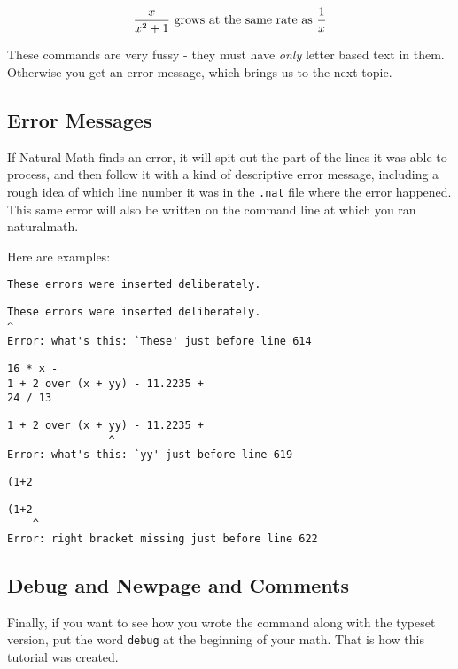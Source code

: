 \documentclass[12pt]{article}
\begin{document}
\[
\frac {x} {{x} ^ {2} + 1} \hbox{ grows at the same rate as } \frac {1} {x}
\]

\noindent These commands are very fussy - they must have {\em only\/} letter based
text in them.  Otherwise you get an error message, which brings us to the
next topic.

\noindent \subsection{Error Messages}

\noindent \indent
If Natural Math finds an error, it will spit out the part of the lines
it was able to process, and then follow it with a kind of descriptive
error message, including a rough idea of which line number it was
in the {\tt .nat} file where the error happened.  This same
error will also be written on the command line at which you ran
naturalmath.

\noindent \indent
Here are examples:

\begin{verbatim}
These errors were inserted deliberately.
\end{verbatim}

\begin{verbatim}
These errors were inserted deliberately.
^
Error: what's this: `These' just before line 614
\end{verbatim}

\begin{verbatim}
16 * x -
1 + 2 over (x + yy) - 11.2235 +
24 / 13
\end{verbatim}

\begin{verbatim}
1 + 2 over (x + yy) - 11.2235 +
                ^
Error: what's this: `yy' just before line 619
\end{verbatim}

\begin{verbatim}
(1+2
\end{verbatim}

\begin{verbatim}
(1+2
    ^
Error: right bracket missing just before line 622
\end{verbatim}

\noindent \subsection{Debug and Newpage and Comments}

\noindent \indent
Finally, if you want to see how you wrote the command along with
the typeset version, put the word {\tt debug} at the beginning of
your math.  That is how this tutorial was created.
\end{document}
